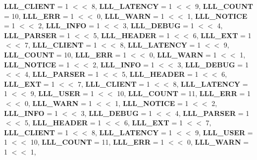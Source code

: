 \begin{DoxyCompactItemize}
{\bfseries L\+L\+L\+\_\+\+C\+L\+I\+E\+NT} = 1 $<$$<$ 8, 
{\bfseries L\+L\+L\+\_\+\+L\+A\+T\+E\+N\+CY} = 1 $<$$<$ 9, 
{\bfseries L\+L\+L\+\_\+\+C\+O\+U\+NT} = 10, 
\newline
{\bfseries L\+L\+L\+\_\+\+E\+RR} = 1 $<$$<$ 0, 
{\bfseries L\+L\+L\+\_\+\+W\+A\+RN} = 1 $<$$<$ 1, 
{\bfseries L\+L\+L\+\_\+\+N\+O\+T\+I\+CE} = 1 $<$$<$ 2, 
{\bfseries L\+L\+L\+\_\+\+I\+N\+FO} = 1 $<$$<$ 3, 
\newline
{\bfseries L\+L\+L\+\_\+\+D\+E\+B\+UG} = 1 $<$$<$ 4, 
{\bfseries L\+L\+L\+\_\+\+P\+A\+R\+S\+ER} = 1 $<$$<$ 5, 
{\bfseries L\+L\+L\+\_\+\+H\+E\+A\+D\+ER} = 1 $<$$<$ 6, 
{\bfseries L\+L\+L\+\_\+\+E\+XT} = 1 $<$$<$ 7, 
\newline
{\bfseries L\+L\+L\+\_\+\+C\+L\+I\+E\+NT} = 1 $<$$<$ 8, 
{\bfseries L\+L\+L\+\_\+\+L\+A\+T\+E\+N\+CY} = 1 $<$$<$ 9, 
{\bfseries L\+L\+L\+\_\+\+C\+O\+U\+NT} = 10, 
{\bfseries L\+L\+L\+\_\+\+E\+RR} = 1 $<$$<$ 0, 
\newline
{\bfseries L\+L\+L\+\_\+\+W\+A\+RN} = 1 $<$$<$ 1, 
{\bfseries L\+L\+L\+\_\+\+N\+O\+T\+I\+CE} = 1 $<$$<$ 2, 
{\bfseries L\+L\+L\+\_\+\+I\+N\+FO} = 1 $<$$<$ 3, 
{\bfseries L\+L\+L\+\_\+\+D\+E\+B\+UG} = 1 $<$$<$ 4, 
\newline
{\bfseries L\+L\+L\+\_\+\+P\+A\+R\+S\+ER} = 1 $<$$<$ 5, 
{\bfseries L\+L\+L\+\_\+\+H\+E\+A\+D\+ER} = 1 $<$$<$ 6, 
{\bfseries L\+L\+L\+\_\+\+E\+XT} = 1 $<$$<$ 7, 
{\bfseries L\+L\+L\+\_\+\+C\+L\+I\+E\+NT} = 1 $<$$<$ 8, 
\newline
{\bfseries L\+L\+L\+\_\+\+L\+A\+T\+E\+N\+CY} = 1 $<$$<$ 9, 
{\bfseries L\+L\+L\+\_\+\+U\+S\+ER} = 1 $<$$<$ 10, 
{\bfseries L\+L\+L\+\_\+\+C\+O\+U\+NT} = 11, 
{\bfseries L\+L\+L\+\_\+\+E\+RR} = 1 $<$$<$ 0, 
\newline
{\bfseries L\+L\+L\+\_\+\+W\+A\+RN} = 1 $<$$<$ 1, 
{\bfseries L\+L\+L\+\_\+\+N\+O\+T\+I\+CE} = 1 $<$$<$ 2, 
{\bfseries L\+L\+L\+\_\+\+I\+N\+FO} = 1 $<$$<$ 3, 
{\bfseries L\+L\+L\+\_\+\+D\+E\+B\+UG} = 1 $<$$<$ 4, 
\newline
{\bfseries L\+L\+L\+\_\+\+P\+A\+R\+S\+ER} = 1 $<$$<$ 5, 
{\bfseries L\+L\+L\+\_\+\+H\+E\+A\+D\+ER} = 1 $<$$<$ 6, 
{\bfseries L\+L\+L\+\_\+\+E\+XT} = 1 $<$$<$ 7, 
{\bfseries L\+L\+L\+\_\+\+C\+L\+I\+E\+NT} = 1 $<$$<$ 8, 
\newline
{\bfseries L\+L\+L\+\_\+\+L\+A\+T\+E\+N\+CY} = 1 $<$$<$ 9, 
{\bfseries L\+L\+L\+\_\+\+U\+S\+ER} = 1 $<$$<$ 10, 
{\bfseries L\+L\+L\+\_\+\+C\+O\+U\+NT} = 11, 
{\bfseries L\+L\+L\+\_\+\+E\+RR} = 1 $<$$<$ 0, 
\newline
{\bfseries L\+L\+L\+\_\+\+W\+A\+RN} = 1 $<$$<$ 1, 

\end{DoxyCompactItemize}

